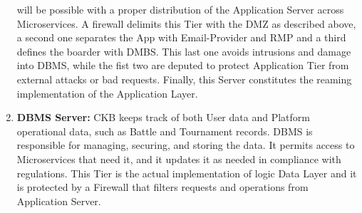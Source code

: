 \begin{enumerate}[label=$\bullet$]
    will be possible with a proper distribution of the Application Server across Microservices. A firewall delimits this Tier with the DMZ as described above, a second one separates the App with Email-Provider and RMP and a third defines the boarder with DMBS.
    This last one avoids intrusions and damage into DBMS, while the fist two are deputed to protect Application Tier from external attacks or bad requests. Finally, this Server constitutes the reaming implementation of the Application Layer.
    \item \textbf{DBMS Server:} CKB keeps track of both User data and Platform operational data, such as Battle and Tournament records. DBMS is responsible for managing, securing, and storing the data. It permits access to 
    Microservices that need it, and it updates it as needed in compliance with regulations. This Tier is the actual implementation of logic Data Layer and it is protected by a Firewall that filters requests and operations from Application Server. 
\end{enumerate}

